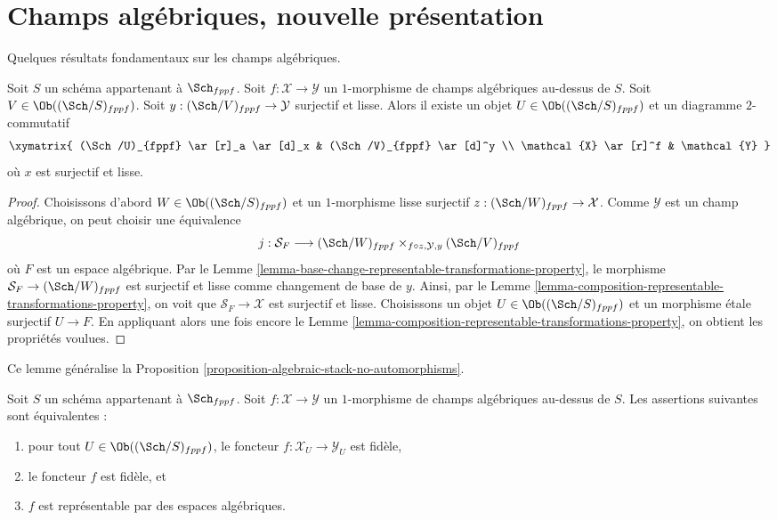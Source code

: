 \section{Champs algébriques, nouvelle présentation}
\label{section-overhaul}

\noindent
Quelques résultats fondamentaux sur les champs algébriques.

\begin{lemma}
\label{lemma-lift-morphism-presentations}
Soit $S$ un schéma appartenant à $\Sch_{fppf}$.
Soit $f : \mathcal{X} \to \mathcal{Y}$ un $1$-morphisme de champs
algébriques au-dessus de $S$.
Soit $V \in \Ob((\Sch/S)_{fppf})$.
Soit $y : (\Sch/V)_{fppf} \to \mathcal{Y}$ surjectif et lisse.
Alors il existe un objet $U \in \Ob((\Sch/S)_{fppf})$
et un diagramme $2$-commutatif
$$
\xymatrix{
(\Sch/U)_{fppf} \ar[r]_a \ar[d]_x &
(\Sch/V)_{fppf} \ar[d]^y \\
\mathcal{X} \ar[r]^f & \mathcal{Y}
}
$$
où $x$ est surjectif et lisse.
\end{lemma}

\begin{proof}
Choisissons d'abord $W \in \Ob((\Sch/S)_{fppf})$ et un $1$-morphisme
lisse surjectif $z : (\Sch/W)_{fppf} \to \mathcal{X}$.
Comme $\mathcal{Y}$ est un champ algébrique, on peut choisir une équivalence
$$
j :
\mathcal{S}_F
\longrightarrow
(\Sch/W)_{fppf}
\times_{f \circ z, \mathcal{Y}, y}
(\Sch/V)_{fppf}
$$
où $F$ est un espace algébrique. Par le
Lemme \ref{lemma-base-change-representable-transformations-property},
le morphisme
$\mathcal{S}_F \to (\Sch/W)_{fppf}$ est surjectif et lisse
comme changement de base de $y$. Ainsi, par le
Lemme \ref{lemma-composition-representable-transformations-property},
on voit que $\mathcal{S}_F \to \mathcal{X}$ est surjectif et lisse.
Choisissons un objet $U \in \Ob((\Sch/S)_{fppf})$
et un morphisme \'etale surjectif $U \to F$. En appliquant alors
une fois encore le Lemme \ref{lemma-composition-representable-transformations-property},
on obtient les propriétés voulues.
\end{proof}

\noindent
Ce lemme généralise la
Proposition \ref{proposition-algebraic-stack-no-automorphisms}.

\begin{lemma}
\label{lemma-characterize-representable-by-algebraic-spaces}
Soit $S$ un schéma appartenant à $\Sch_{fppf}$.
Soit $f : \mathcal{X} \to \mathcal{Y}$ un $1$-morphisme de champs
algébriques au-dessus de $S$. Les assertions suivantes sont équivalentes :
\begin{enumerate}
\item pour tout $U \in \Ob((\Sch/S)_{fppf})$,
le foncteur $f : \mathcal{X}_U \to \mathcal{Y}_U$ est fidèle,
\item le foncteur $f$ est fidèle, et
\item $f$ est représentable par des espaces algébriques.
\end{enumerate}
\end{lemma}

